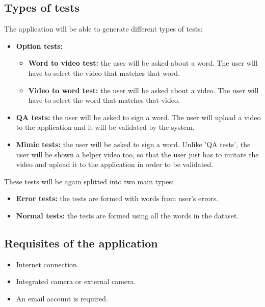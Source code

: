 \subsection{Types of tests}
The application will be able to generate different types of tests:
\begin{itemize}[noitemsep]
    \item \textbf{Option tests:}
        \begin{itemize}[noitemsep]
            \item \textbf{Word to video test:} the user will be asked about a word. The user will have to select the video that matches that word.
            \item \textbf{Video to word test:} the user will be asked about a video. The user will have to select the word that matches that video.
        \end{itemize}
    \item \textbf{QA tests:} the user will be asked to sign a word. The user will upload a video to the application and it will be validated by the system.
    \item \textbf{Mimic tests:} the user will be asked to sign a word. Unlike 'QA tests', the user will be shown a helper video too, so that the user just has to imitate the video and upload it to the application in order to be validated.
\end{itemize}

These tests will be again splitted into two main types:
\begin{itemize}[noitemsep]
    \item \textbf{Error tests:} the tests are formed with words from user's errors.
    \item \textbf{Normal tests:} the tests are formed using all the words in the dataset.
\end{itemize}

\subsection{Requisites of the application}
\begin{itemize}[noitemsep]
    \item Internet connection.
    \item Integrated camera or external camera.
    \item An email account is required.
\end{itemize}


